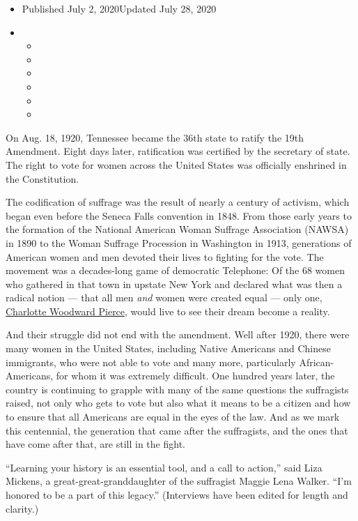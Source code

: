 \begin{itemize}
\item
  Published July 2, 2020Updated July 28, 2020
\item
  \begin{itemize}
  \item
  \item
  \item
  \item
  \item
  \item
  \end{itemize}
\end{itemize}

On Aug. 18, 1920, Tennessee became the 36th state to ratify the 19th
Amendment. Eight days later, ratification was certified by the secretary
of state. The right to vote for women across the United States was
officially enshrined in the Constitution.

The codification of suffrage was the result of nearly a century of
activism, which began even before the Seneca Falls convention in 1848.
From those early years to the formation of the National American Woman
Suffrage Association (NAWSA) in 1890 to the Woman Suffrage Procession in
Washington in 1913, generations of American women and men devoted their
lives to fighting for the vote. The movement was a decades-long game of
democratic Telephone: Of the 68 women who gathered in that town in
upstate New York and declared what was then a radical notion --- that
all men \emph{and} women were created equal --- only one,
\href{https://www.smithsonianmag.com/smart-news/only-one-woman-who-was-seneca-falls-lived-see-women-win-vote-180964044/}{Charlotte
Woodward Pierce}, would live to see their dream become a reality.

And their struggle did not end with the amendment. Well after 1920,
there were many women in the United States, including Native Americans
and Chinese immigrants, who were not able to vote and many more,
particularly African-Americans, for whom it was extremely difficult. One
hundred years later, the country is continuing to grapple with many of
the same questions the suffragists raised, not only who gets to vote but
also what it means to be a citizen and how to ensure that all Americans
are equal in the eyes of the law. And as we mark this centennial, the
generation that came after the suffragists, and the ones that have come
after that, are still in the fight.

``Learning your history is an essential tool, and a call to action,''
said Liza Mickens, a great-great-granddaughter of the suffragist Maggie
Lena Walker. ``I'm honored to be a part of this legacy.'' (Interviews
have been edited for length and clarity.)

